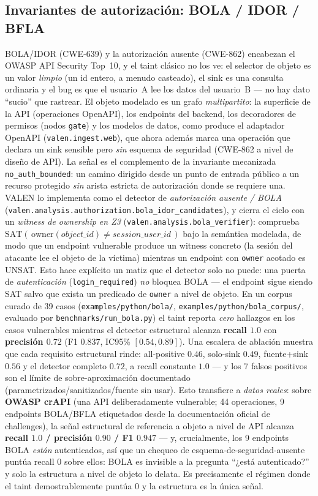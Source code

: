 \documentclass[11pt]{article}
\begin{document}
\subsection{Invariantes de autorización: BOLA / IDOR / BFLA}
BOLA/IDOR (CWE-639) y la autorización ausente (CWE-862) encabezan el OWASP API
Security Top~10, y el taint clásico no los ve: el selector de objeto es un valor
\emph{limpio} (un id entero, a menudo casteado), el sink es una consulta
ordinaria y el bug es que el usuario~A lee los datos del usuario~B --- no hay
dato ``sucio'' que rastrear. El objeto modelado es un grafo \emph{multipartito}:
la superficie de la API (operaciones OpenAPI), los endpoints del backend, los
decoradores de permisos (nodos \texttt{gate}) y los modelos de datos, como
produce el adaptador OpenAPI (\texttt{valen.ingest.web}), que ahora además
marca una operación que declara un sink sensible pero \emph{sin} esquema de
seguridad (CWE-862 a nivel de diseño de API). La señal es el complemento de la
invariante mecanizada \texttt{no\_auth\_bounded}: un camino dirigido desde un
punto de entrada público a un recurso protegido \emph{sin} arista estricta de
autorización donde se requiere una. VALEN lo implementa como el detector de
\emph{autorización ausente / BOLA}
(\texttt{valen.analysis.authorization.bola\_idor\_candidates}), y cierra el
ciclo con un \emph{witness de ownership en Z3}
(\texttt{valen.analysis.bola\_verifier}): comprueba
$\mathrm{SAT}(\,\mathrm{owner}(object\_id)\neq session\_user\_id\,)$ bajo la
semántica modelada, de modo que un endpoint vulnerable produce un witness
concreto (la sesión del atacante lee el objeto de la víctima) mientras un
endpoint con \texttt{owner} acotado es UNSAT. Esto hace explícito un matiz que el
detector solo no puede: una puerta de \emph{autenticación}
(\texttt{login\_required}) \emph{no} bloquea BOLA --- el endpoint sigue siendo
SAT salvo que exista un predicado de \texttt{owner} a nivel de objeto. En un
corpus curado de 39 casos (\texttt{examples/python/bola/},
\texttt{examples/python/bola\_corpus/}, evaluado por
\texttt{benchmarks/run\_bola.py}) el taint reporta \emph{cero}
hallazgos en los casos vulnerables mientras el detector estructural alcanza
\textbf{recall $1.0$} con \textbf{precisión $0.72$} (F1 $0.837$, IC95\%
$[0.54,0.89]$). Una escalera de ablación muestra que cada requisito estructural
rinde: all-positive $0.46$, solo-sink $0.49$, fuente+sink $0.56$ y el detector
completo $0.72$, a recall constante $1.0$ --- y los 7 falsos positivos son el
límite de sobre-aproximación documentado (parametrizados/sanitizados/fuente sin
usar). Esto transfiere a \emph{datos reales}: sobre \textbf{OWASP crAPI} (una API
deliberadamente vulnerable; 44 operaciones, 9 endpoints BOLA/BFLA etiquetados
desde la documentación oficial de challenges), la señal estructural de referencia
a objeto a nivel de API alcanza \textbf{recall $1.0$ / precisión $0.90$ / F1
$0.947$} --- y, crucialmente, los 9 endpoints BOLA \emph{están} autenticados, así
que un chequeo de esquema-de-seguridad-ausente puntúa recall $0$ sobre ellos:
BOLA es invisible a la pregunta ``¿está autenticado?'' y solo la estructura a
nivel de objeto lo delata. Es precisamente el régimen donde el taint
demostrablemente puntúa $0$ y la estructura es la única señal.
\end{document}
